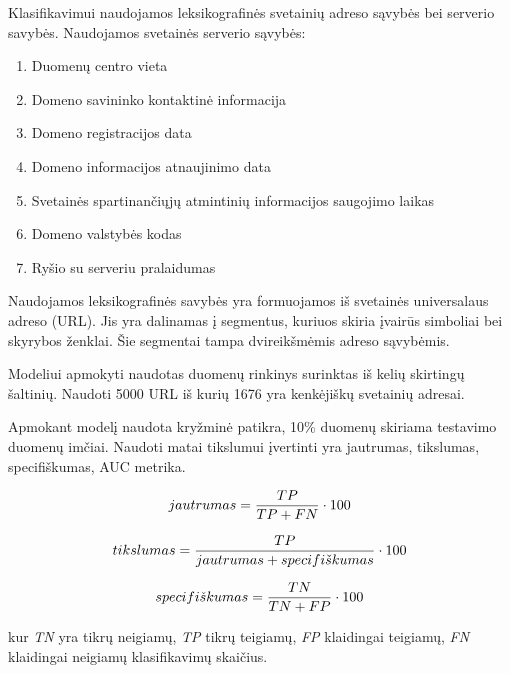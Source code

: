 Klasifikavimui naudojamos leksikografinės svetainių adreso sąvybės bei serverio savybės. Naudojamos svetainės serverio sąvybės:
\begin{enumerate}[label=\arabic*.]
    \item Duomenų centro vieta
    \item Domeno savininko kontaktinė informacija
    \item Domeno registracijos data
    \item Domeno informacijos atnaujinimo data
    \item Svetainės spartinančiųjų atmintinių informacijos saugojimo laikas
    \item Domeno valstybės kodas
    \item Ryšio su serveriu pralaidumas
\end{enumerate}

Naudojamos leksikografinės savybės yra formuojamos iš svetainės universalaus adreso (URL). Jis yra dalinamas į segmentus, kuriuos skiria įvairūs simboliai bei skyrybos ženklai. Šie segmentai tampa dvireikšmėmis adreso sąvybėmis.


Modeliui apmokyti naudotas duomenų rinkinys surinktas iš kelių skirtingų šaltinių. Naudoti 5000 URL iš kurių 1676 yra kenkėjiškų svetainių adresai.


Apmokant modelį naudota kryžminė patikra, 10\% duomenų skiriama testavimo duomenų imčiai. Naudoti matai tikslumui įvertinti yra jautrumas, tikslumas, specifiškumas, AUC metrika.

\begin{equation}\label{eq:jautrumas}
jautrumas = {TP \over {TP + FN}} \cdot 100
\end{equation}

\begin{equation}\label{eq:tikslumas}
tikslumas = {TP \over {jautrumas + specifi \check skumas}} \cdot 100
\end{equation}

\begin{equation}\label{eq:specifiškumas}
specifi \check skumas = {TN \over {TN + FP}} \cdot 100
\end{equation}

kur \textit{TN} yra tikrų neigiamų, \textit{TP} tikrų teigiamų, \textit{FP} klaidingai teigiamų, \textit{FN} klaidingai
neigiamų klasifikavimų skaičius.


